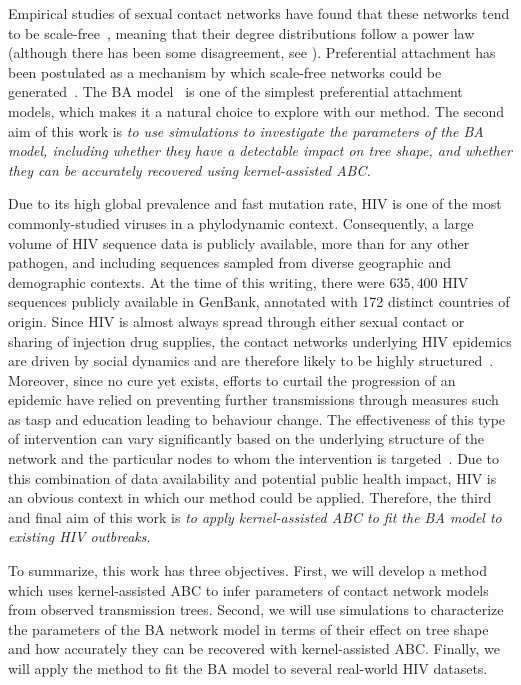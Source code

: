 Empirical studies of sexual contact networks have found that these networks
tend to be scale-free~\autocite{colgate1989risk, liljeros2001web,
schneeberger2004scale,clemenccon2015statistical}, meaning that their degree
distributions follow a power law (although there has been some disagreement,
see \autocite{handcock2004likelihood, bansal2007individual}). Preferential
attachment has been postulated as a mechanism by which scale-free networks
could be generated~\autocite{barabasi1999emergence}. The \gls{BA}
model~\autocite{barabasi1999emergence} is one of the simplest preferential
attachment models, which makes it a natural choice to explore with our method.
The second aim of this work is \emph{to use simulations to investigate the
parameters of the \gls{BA} model, including whether they have a detectable
impact on tree shape, and whether they can be accurately recovered using
kernel-assisted \gls{ABC}.}

Due to its high global prevalence and fast mutation rate, \gls{HIV} is one of
the most commonly-studied viruses in a phylodynamic context. Consequently, a
large volume of \gls{HIV} sequence data is publicly available, more than for
any other pathogen, and including sequences sampled from diverse geographic and
demographic contexts. At the time of this writing, there were $635,400$ HIV
sequences publicly available in GenBank, annotated with 172 distinct countries
of origin. Since \gls{HIV} is almost always spread through either sexual
contact or sharing of injection drug supplies, the contact networks underlying
\gls{HIV} epidemics are driven by social dynamics and are therefore likely to
be highly structured~\autocite{clemenccon2015statistical}. Moreover, since no
cure yet exists, efforts to curtail the progression of an epidemic have relied
on preventing further transmissions through measures such as \gls{tasp} and
education leading to behaviour change. The effectiveness of this type of
intervention can vary significantly based on the underlying structure of the
network and the particular nodes to whom the intervention is
targeted~\autocite{little2014using,wang2015targeting}. Due to this combination
of data availability and potential public health impact, \gls{HIV} is an
obvious context in which our method could be applied. Therefore, the third and
final aim of this work is \emph{to apply kernel-assisted \gls{ABC} to fit the
\gls{BA} model to existing \gls{HIV} outbreaks}.

To summarize, this work has three objectives. First, we will develop a method
which uses kernel-assisted \gls{ABC} to infer parameters of contact network
models from observed transmission trees. Second, we will use simulations to
characterize the parameters of the \gls{BA} network model in terms of their
effect on tree shape and how accurately they can be recovered with
kernel-assisted \gls{ABC}. Finally, we will apply the method to fit the
\gls{BA} model to several real-world \gls{HIV} datasets.

